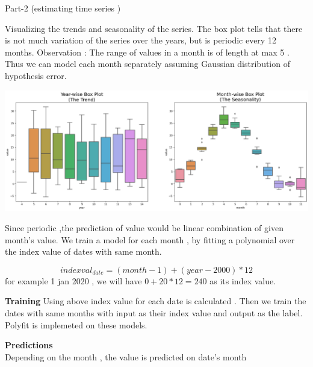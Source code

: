 \documentclass[11pt]{beamer}
\begin{document}
\begin{frame}
\begin{Huge}
Part-2 (estimating time series )
\end{Huge}
\end{frame}

\begin{frame}
Visualizing the trends and seasonality of the series.
The box plot tells that there is not much variation of the series over the years, but is periodic every 12 months.
Observation : The range of values in a month is of length at max 5 .
Thus we can model each month separately assuming Gaussian distribution of hypothesis error. 

\includegraphics[scale=0.25]{images/33.png}

\end{frame}

\begin{frame}
Since periodic ,the prediction of value would be linear combination of given month's value.  We train a model for each month , by fitting a polynomial over the  index value of  dates with same month.

$$indexval_{date} = (month -1)+(year-2000)*12 $$
for example 1 jan 2020 , we will have $0+20*12 =240$ as its index value.

\textbf{Training}
Using above index value for each date is calculated . 
Then we train the dates with  same months with input as their index value and output as the label. Polyfit is implemeted on these models.

\textbf{Predictions}\\
Depending on the month , the value is predicted on date's month
\end{frame}
\end{document}
